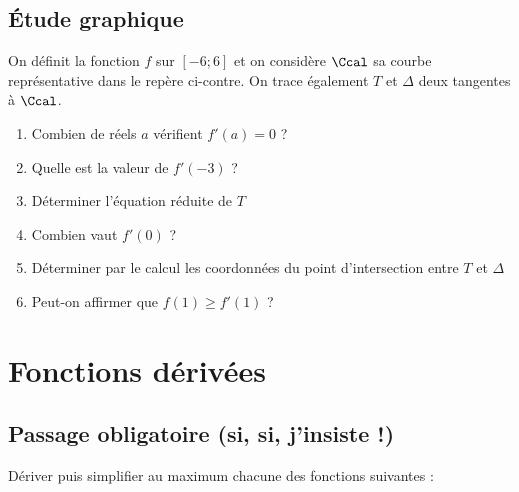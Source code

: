 \documentclass[oneside,12pt]{book}          %
\begin{document}
\subsection{Étude graphique}
\begin{minipage}{0.5\linewidth}
On définit la fonction $f$ sur $[-6;6]$ et on considère $\Ccal$ sa courbe représentative dans le repère ci-contre. On trace également $T$ et $\Delta$ deux tangentes à $\Ccal$.
\begin{enumerate}
	\item Combien de réels $a$ vérifient $f'(a)=0$ ?
	\item Quelle est la valeur de $f'(-3)$ ?
	\item Déterminer l'équation réduite de $T$
	\item Combien vaut $f'(0)$ ?
	\item Déterminer par le calcul les coordonnées du point d'intersection entre $T$ et $\Delta$
	\item Peut-on affirmer que $f(1)\geq f'(1)$ ?
\end{enumerate}
\end{minipage}\hfill
\begin{minipage}{0.5\linewidth}
\end{minipage}



\section{Fonctions dérivées}

\subsection{Passage obligatoire (si, si, j'insiste !)}
Dériver puis simplifier au maximum chacune des fonctions suivantes :
\end{document}
